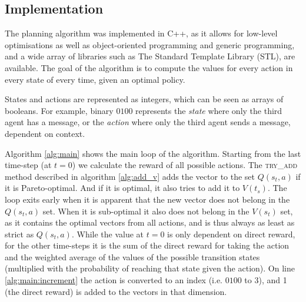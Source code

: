 \documentclass{article}
\begin{document}
\begin{multicols}{2}
		\subsection{Implementation}
		\label{sub:implementation}
		The planning algorithm was implemented in C++, as it allows for low-level
		optimisations as well as object-oriented programming and generic
		programming, and a wide array of libraries such as The Standard Template
		Library (STL), are available.
		The goal of the algorithm is to compute the values for every action in
		every state of every time, given an optimal policy.

		States and actions are represented as integers, which can be seen as
		arrays of booleans. For example, binary $0100$ represents the
		\emph{state} where only the third agent has a message, or the
		\emph{action} where only the third agent sends a message, dependent on
		context.

		Algorithm \ref{alg:main} shows the main loop of the algorithm. Starting
		from the last time-step (at $t=0$) we calculate the reward of all
		possible actions.
		The \textsc{try\_add} method described in algorithm
		\ref{alg:add_v} adds the vector to the set $Q(s_t, a)$ if it is
		Pareto-optimal. And if it is optimal, it also tries to add it to
		$V(t_s)$. The loop exits early when it is apparent that the new vector
		does not belong in the $Q(s_t, a)$ set. When it is sub-optimal it also does not
		belong in the $V(s_t)$ set, as it contains the optimal vectors from all
		actions, and is thus always as least as strict as $Q(s_t, a)$.
		While the value at $t=0$ is only dependent on direct reward, for the
		other time-steps it is the sum of the direct reward for taking the action
		and the weighted average of the values of the possible transition states
		(multiplied with the probability of reaching that state given the
		action). On line \ref{alg:main:increment} the action is converted to an
		index (i.e. $0100$ to 3), and 1 (the direct reward) is added to the
		vectors in that dimension.

		\end{multicols}
\end{document}

